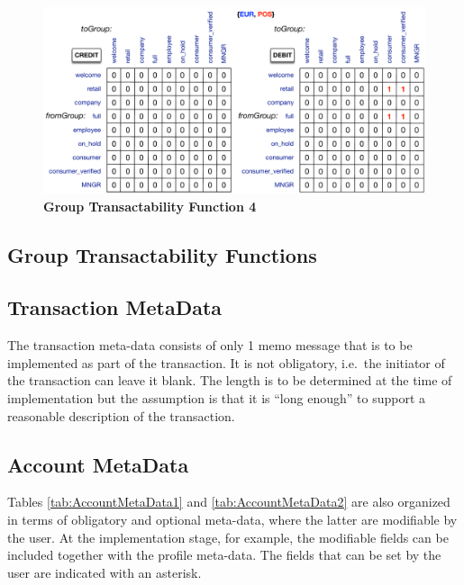 \begin{figure}[H]
\centering
\includegraphics[width=17.5cm]{Figures/GTF4}
\caption{\small\textbf{Group Transactability Function 4}}
\label{fig:GTF4}
\end{figure}


\subsection{Group Transactability Functions}



\subsection{Transaction MetaData}

The transaction meta-data consists of only 1 memo message that is to be implemented as part of the transaction. It is not obligatory, i.e.\ the initiator of the transaction can leave it blank. The length is to be determined at the time of implementation but the assumption is that it is ``long enough'' to support a reasonable description of the transaction.

\newpage

\subsection{Account MetaData}
Tables \ref{tab:AccountMetaData1} and \ref{tab:AccountMetaData2} are also organized in terms of obligatory and optional meta-data, where the latter are modifiable by the user. At the implementation stage, for example, the modifiable fields can be included together with the profile meta-data. The fields that can be set by the user are indicated with an asterisk.

